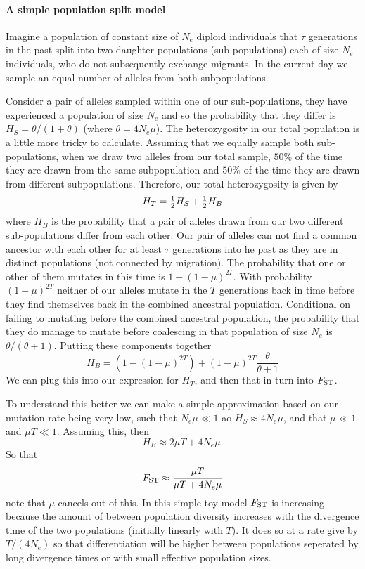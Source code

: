 \paragraph{A simple population split model}
Imagine a population of constant size of $N_e$ diploid individuals that
$\tau$ generations in the past split into two daughter populations (sub-populations)
each of size $N_e$ individuals, who do not subsequently exchange
migrants. In the current day we sample an equal number of alleles
from both subpopulations.

Consider a pair of alleles sampled within one of our
sub-populations, they have experienced a population of size $N_e$
and so the probability that they differ is $H_S = \theta/(1+\theta)$
(where $\theta=4N_e\mu$).
The heterozygosity in our total population is a little more tricky to
calculate. Assuming that we equally sample both sub-populations, when we draw two alleles from our total
sample, $50\%$ of the time they are drawn from the same
subpopulation and $50\%$ of the time they are drawn from different
subpopulations. Therefore, our total heterozygosity is given by
\begin{equation}
H_T = \tfrac{1}{2} H_S + \tfrac{1}{2} H_B
\end{equation}
where $H_B$ is the probability that a pair of alleles drawn from our
two different sub-populations differ from each other. Our pair of
alleles can not find a common ancestor with each other for at least $\tau$
generations into he past as they are in distinct populations (not
connected by migration). The probability that one or other of them
mutates in this time is $1-(1-\mu)^{2T}$. With probability
$(1-\mu)^{2T} $ neither of our alleles mutate in the $T$ generations
back in time before they find themselves back in the combined ancestral 
population. Conditional on failing to mutating before the combined ancestral
population, the probability that they do manage to mutate before
coalescing in that population of size $N_e$ is
$\theta/(\theta+1)$. Putting these components together
\begin{equation}
H_B = \left( 1-(1-\mu)^{2T} \right) + (1-\mu)^{2T}
  \frac{\theta}{\theta+1} 
\end{equation}
We can plug this into our expression for $H_T$, and then that in turn
into $F_{\mathrm{ST}}$.

To understand this better we can make a simple
approximation based on our mutation rate being very low, such that
$N_e \mu \ll 1$ ao $H_S \approx
4N_e\mu$, and that $\mu \ll 1$ and $\mu T \ll 1$. Assuming this, then  
\begin{equation}
H_B \approx 2 \mu T + 4N_e\mu. 
\end{equation}
So that 
\begin{equation}
\fst \approx \frac{ \mu T}{\mu T +  4N_e\mu }  %
\end{equation}
note that $\mu$ cancels out of this. In this simple toy model $F_{\mathrm{ST}}$
is increasing because the amount of between population diversity 
increases with the divergence time of the two populations (initially
linearly with $T$). It does so at a rate
give by $T/(4N_e)$ so that differentiation will be higher
between populations seperated by long divergence times or with small
effective population sizes.

